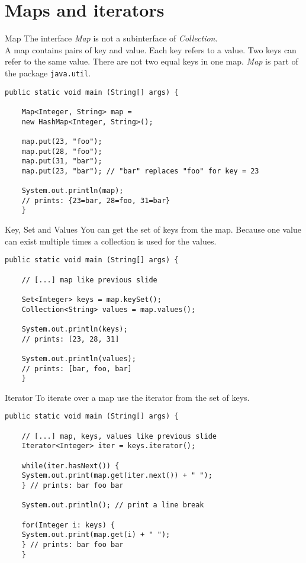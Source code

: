 \section{Maps and iterators}
\begin{frame}[fragile]{Map}
	The interface \emph{Map} is not a subinterface of \emph{Collection}.\\
	A map contains pairs of key and value. Each key refers to a value. 
	Two keys can refer to the same value. There are not two equal keys in one map.
	\emph{Map} is part of the package \texttt{java.util}.
	\vfill
	\begin{lstlisting}[basicstyle=\ttfamily\scriptsize]
	public static void main (String[] args) {
	
	Map<Integer, String> map = 
	new HashMap<Integer, String>();
	
	map.put(23, "foo");
	map.put(28, "foo");
	map.put(31, "bar");
	map.put(23, "bar"); // "bar" replaces "foo" for key = 23
	
	System.out.println(map);
	// prints: {23=bar, 28=foo, 31=bar}
	}
	\end{lstlisting}
\end{frame}

\begin{frame}[fragile]{Key, Set and Values}
	You can get the set of keys from the map.
	Because one value can exist multiple times a collection is used for the values.
	\begin{lstlisting}[basicstyle=\ttfamily\scriptsize]
	public static void main (String[] args) {
	
	// [...] map like previous slide
	
	Set<Integer> keys = map.keySet();
	Collection<String> values = map.values();
	
	System.out.println(keys);
	// prints: [23, 28, 31]
	
	System.out.println(values);
	// prints: [bar, foo, bar]
	}
	\end{lstlisting}
\end{frame}

\begin{frame}[fragile]{Iterator}
	To iterate over a map use the iterator from the set of keys.
	\begin{lstlisting}[basicstyle=\ttfamily\scriptsize]
	public static void main (String[] args) {
	
	// [...] map, keys, values like previous slide    	    
	Iterator<Integer> iter = keys.iterator();
	
	while(iter.hasNext()) {
	System.out.print(map.get(iter.next()) + " ");
	} // prints: bar foo bar
	
	System.out.println(); // print a line break
	
	for(Integer i: keys) {
	System.out.print(map.get(i) + " ");
	} // prints: bar foo bar
	}
	\end{lstlisting}
\end{frame}

